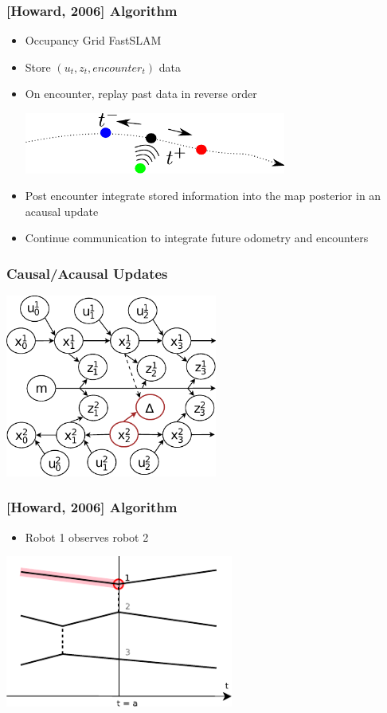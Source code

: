 \begin{frame}
\frametitle{[Howard, 2006] Algorithm}
\begin{itemize}
\item Occupancy Grid FastSLAM 
\item Store $(u_t,z_t,encounter_t)$ data
\item On encounter, replay past data in reverse order
\begin{center}
\includegraphics[height=2cm]{../FiguresAndMovies/ForwardBackward}
\end{center}
\item Post encounter integrate stored information into the map posterior in an acausal update
\item Continue communication to integrate future odometry and encounters
\end{itemize}
\end{frame}


\begin{frame}
\frametitle{Causal/Acausal Updates}
\begin{center}
\includegraphics[height=6cm]{../FiguresAndMovies/HowardFig3}
\end{center}
\end{frame}

\begin{frame}
\frametitle{[Howard, 2006] Algorithm}
\begin{itemize}
\item Robot 1 observes robot 2
\end{itemize}
\begin{center}
\includegraphics[height=5cm]{../FiguresAndMovies/Howard5a}
\end{center}
\end{frame}


